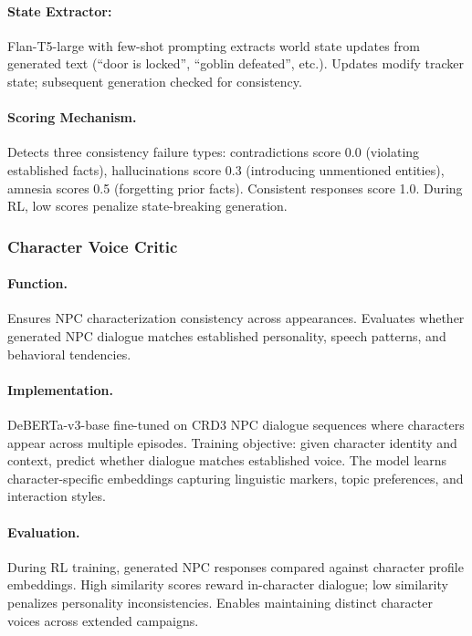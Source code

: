 \documentclass[11pt]{article}
\begin{document}
\paragraph{State Extractor:} Flan-T5-large with few-shot prompting extracts world state updates from generated text (``door is locked'', ``goblin defeated'', etc.). Updates modify tracker state; subsequent generation checked for consistency.

\paragraph{Scoring Mechanism.} Detects three consistency failure types: contradictions score 0.0 (violating established facts), hallucinations score 0.3 (introducing unmentioned entities), amnesia scores 0.5 (forgetting prior facts). Consistent responses score 1.0. During RL, low scores penalize state-breaking generation.

\subsubsection{Character Voice Critic}

\paragraph{Function.} Ensures NPC characterization consistency across appearances. Evaluates whether generated NPC dialogue matches established personality, speech patterns, and behavioral tendencies.

\paragraph{Implementation.} DeBERTa-v3-base fine-tuned on CRD3 NPC dialogue sequences where characters appear across multiple episodes. Training objective: given character identity and context, predict whether dialogue matches established voice. The model learns character-specific embeddings capturing linguistic markers, topic preferences, and interaction styles.

\paragraph{Evaluation.} During RL training, generated NPC responses compared against character profile embeddings. High similarity scores reward in-character dialogue; low similarity penalizes personality inconsistencies. Enables maintaining distinct character voices across extended campaigns.
\end{document}
